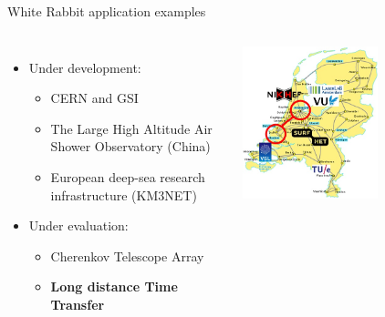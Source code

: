 \documentclass[compress, red]{beamer}
\begin{document}
\begin{frame}{White Rabbit application examples}
\begin{columns}[c]
    \begin{itemize}
      \item Under development:
      \begin{itemize}
	\item CERN and GSI
	\item The Large High Altitude Air Shower Observatory (China)
	\item European deep-sea research infrastructure (KM3NET) 
      \end{itemize}         	
      \item Under evaluation:
      \begin{itemize}
	\item Cherenkov Telescope Array
	\item \textbf{Long distance Time Transfer}
      \end{itemize}         	
    \end{itemize}    
    \begin{center}
      \includegraphics[width=0.6\textwidth]{../../figures/applications/netherlands.jpg}
      \end{center}
\end{columns}
\end{frame}
\end{document}
